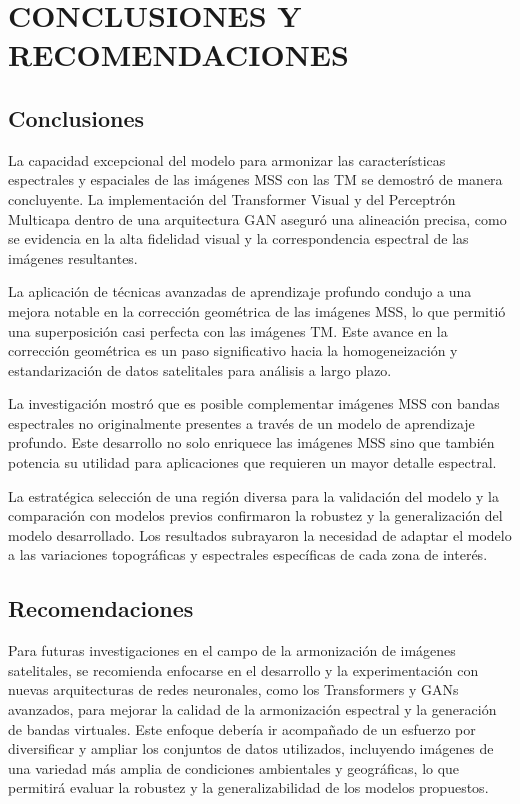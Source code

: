 \chapter{CONCLUSIONES Y RECOMENDACIONES}
    \section{Conclusiones}
        La capacidad excepcional del modelo para armonizar las características espectrales y espaciales de las imágenes MSS con las TM se demostró de manera concluyente. La implementación del Transformer Visual y del Perceptrón Multicapa dentro de una arquitectura GAN aseguró una alineación precisa, como se evidencia en la alta fidelidad visual y la correspondencia espectral de las imágenes resultantes.

        La aplicación de técnicas avanzadas de aprendizaje profundo condujo a una mejora notable en la corrección geométrica de las imágenes MSS, lo que permitió una superposición casi perfecta con las imágenes TM. Este avance en la corrección geométrica es un paso significativo hacia la homogeneización y estandarización de datos satelitales para análisis a largo plazo.

        La investigación mostró que es posible complementar imágenes MSS con bandas espectrales no originalmente presentes a través de un modelo de aprendizaje profundo. Este desarrollo no solo enriquece las imágenes MSS sino que también potencia su utilidad para aplicaciones que requieren un mayor detalle espectral.

        La estratégica selección de una región diversa para la validación del modelo y la comparación con modelos previos confirmaron la robustez y la generalización del modelo desarrollado. Los resultados subrayaron la necesidad de adaptar el modelo a las variaciones topográficas y espectrales específicas de cada zona de interés.

    \section{Recomendaciones}
        Para futuras investigaciones en el campo de la armonización de imágenes satelitales, se recomienda enfocarse en el desarrollo y la experimentación con nuevas arquitecturas de redes neuronales, como los Transformers y GANs avanzados, para mejorar la calidad de la armonización espectral y la generación de bandas virtuales. Este enfoque debería ir acompañado de un esfuerzo por diversificar y ampliar los conjuntos de datos utilizados, incluyendo imágenes de una variedad más amplia de condiciones ambientales y geográficas, lo que permitirá evaluar la robustez y la generalizabilidad de los modelos propuestos.

